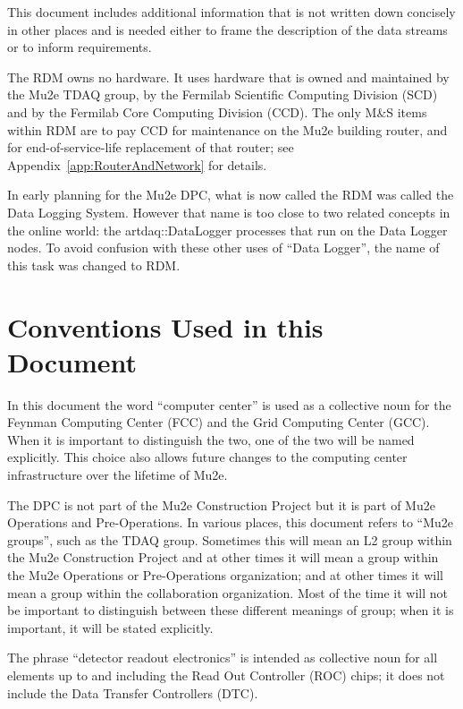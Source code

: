 This document includes additional information that is not written down concisely
in other places and is needed either to frame the description of the data streams
or to inform requirements.


The RDM owns no hardware.  It uses hardware that is owned and maintained
by the Mu2e TDAQ group,
by the Fermilab Scientific Computing Division (SCD)
and by the Fermilab Core Computing Division (CCD).
The only M\&S items within RDM are to pay CCD for maintenance on the Mu2e building router,
and for end-of-service-life replacement of that router;
see Appendix~\ref{app:RouterAndNetwork} for details.

In early planning for the Mu2e DPC, what is now called the RDM was called the Data Logging System.
However that name is too close to two related concepts in the online world:
the {\code artdaq::DataLogger} processes that run on the Data Logger nodes.
To avoid confusion with these other uses of ``Data Logger'',
the name of this task was changed to RDM.

\section{Conventions Used in this Document}
\label{sec:conventions}

In this document the word ``computer center'' is used as a collective noun for the
Feynman Computing Center (FCC) and the Grid Computing Center (GCC).
When it is important to distinguish the two, one of the two will be named explicitly.
This choice also allows future changes to the computing center infrastructure over the
lifetime of Mu2e.

The DPC is not part of the Mu2e Construction Project but it is part of Mu2e Operations
and Pre-Operations.
In various places, this document refers to ``Mu2e groups'', such as the TDAQ group.
Sometimes this will mean an L2 group within the Mu2e Construction Project and at other
times it will mean a group within the Mu2e Operations or Pre-Operations organization;
and at other times it will mean a group within the collaboration organization.
Most of the time it will not be important to distinguish between these different meanings
of group; when it is important, it will be stated explicitly.

The phrase ``detector readout electronics'' is intended as collective noun for all elements
up to and including the Read Out Controller (ROC) chips; it does not include
the Data Transfer Controllers (DTC).

